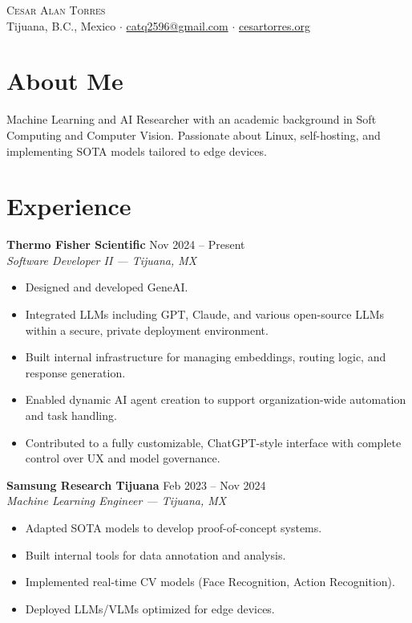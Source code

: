 \documentclass[letterpaper,11pt]{article}
\newcommand{\resumeSubheading}[4]{
  \vspace{1pt}\textbf{#1} \hfill #2\\
  {\emph{#3}} \hfill {\small #4}\\
}
\begin{document}
\begin{center}
    {\LARGE \scshape Cesar Alan Torres} \\ 
    \vspace{1pt}
    Tijuana, B.C., Mexico $\cdot$ \href{mailto:catq2596@gmail.com}{catq2596@gmail.com} $\cdot$ \href{https://cesartorres.org}{cesartorres.org} \\
\end{center}

\section*{About Me}
Machine Learning and AI Researcher with an academic background in Soft Computing and Computer Vision. Passionate about Linux, self-hosting, and implementing SOTA models tailored to edge devices.

\section*{Experience}
\resumeSubheading{Thermo Fisher Scientific}{Nov 2024 -- Present}{Software Developer II — Tijuana, MX}{}
\begin{itemize}[leftmargin=0.15in, itemsep=2pt, topsep=2pt, parsep=0pt]
  \item Designed and developed GeneAI.
  \item Integrated LLMs including GPT, Claude, and various open-source LLMs within a secure, private deployment environment.
  \item Built internal infrastructure for managing embeddings, routing logic, and response generation.
  \item Enabled dynamic AI agent creation to support organization-wide automation and task handling.
  \item Contributed to a fully customizable, ChatGPT-style interface with complete control over UX and model governance.
\end{itemize}

\resumeSubheading{Samsung Research Tijuana}{Feb 2023 -- Nov 2024}{Machine Learning Engineer — Tijuana, MX}{}
\begin{itemize}[leftmargin=0.15in, itemsep=2pt, topsep=2pt, parsep=0pt]
  \item Adapted SOTA models to develop proof-of-concept systems.
  \item Built internal tools for data annotation and analysis.
  \item Implemented real-time CV models (Face Recognition, Action Recognition).
  \item Deployed LLMs/VLMs optimized for edge devices.
\end{itemize}
\end{document}
